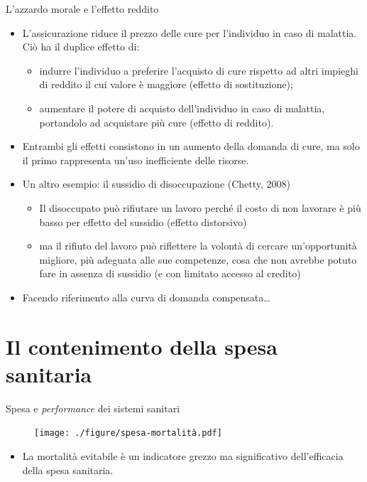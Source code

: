 \documentclass[aspectratio=64,12pt]{beamer}
\begin{document}
\begin{frame}{L'azzardo morale e l'effetto reddito}
\begin{itemize}
\item L'assicurazione riduce il prezzo delle cure per l'individuo in caso di
  malattia. Ciò ha il duplice effetto di:
\begin{itemize}
\item indurre l'individuo a preferire l'acquisto di cure rispetto ad altri
  impieghi di reddito il cui valore è maggiore (effetto di sostituzione);
\item aumentare il potere di acquisto dell'individuo in caso di malattia,
  portandolo ad acquistare più cure (effetto di reddito).
\end{itemize}
\item Entrambi gli effetti consistono in un aumento della domanda di cure, ma solo il primo rappresenta un'uso inefficiente delle risorse.\medskip
\item Un altro esempio: il sussidio di disoccupazione (Chetty, 2008)
\begin{itemize}
\item Il disoccupato può rifiutare un lavoro perché il costo di non lavorare è
più basso per effetto del sussidio (effetto distorsivo)
\item ma il rifiuto del lavoro può riflettere la volontà di cercare
un'opportunità migliore, più adeguata alle sue competenze, cosa che non
avrebbe potuto fare in assenza di sussidio (e con limitato accesso al
credito)
\end{itemize}\medskip
\item Facendo riferimento alla \alert{curva di domanda compensata}\dots
\end{itemize}

\end{frame}

\section{Il contenimento della spesa sanitaria}

\begin{frame}{Spesa e \emph{performance} dei sistemi sanitari}
\begin{figure}[htbp]
\centering
\texttt{[image: ./figure/spesa-mortalità.pdf]}
\end{figure}

\begin{itemize}
\item La mortalità evitabile è un indicatore grezzo ma significativo
  dell'efficacia della spesa sanitaria.
\end{itemize}
\end{frame}
\end{document}
